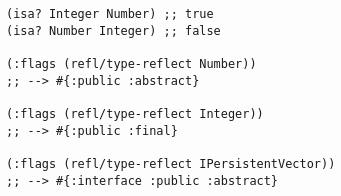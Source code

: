 \begin{lstlisting}[style=reclojureClojure]
(isa? Integer Number) ;; true
(isa? Number Integer) ;; false

(:flags (refl/type-reflect Number))
;; --> #{:public :abstract}

(:flags (refl/type-reflect Integer))
;; --> #{:public :final}

(:flags (refl/type-reflect IPersistentVector)) 
;; --> #{:interface :public :abstract}
\end{lstlisting}

